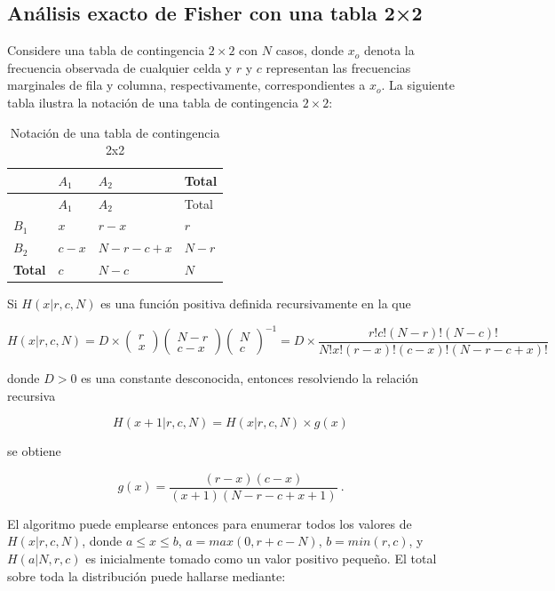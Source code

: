 \documentclass[12pt,a4paper,]{book}
\numberwithin{dummy}{section}
\theoremstyle{ocrenumbox}
\theoremstyle{blacknumex}
\theoremstyle{blacknumbox}
\theoremstyle{ocrenum}
\theoremstyle{ocrenum}
\begin{document}
\hypertarget{anuxe1lisis-exacto-de-fisher-con-una-tabla-22}{%
\subsection{Análisis exacto de Fisher con una tabla
2×2}\label{anuxe1lisis-exacto-de-fisher-con-una-tabla-22}}

Considere una tabla de contingencia \(2\times2\) con \(N\) casos, donde
\(x_o\) denota la frecuencia observada de cualquier celda y \(r\) y
\(c\) representan las frecuencias marginales de fila y columna,
respectivamente, correspondientes a \(x_o\). La siguiente tabla ilustra
la notación de una tabla de contingencia \(2\times2\):

\begin{longtable}[]{@{}llll@{}}
\caption{Notación de una tabla de contingencia 2x2}\tabularnewline
\toprule
& \(A_1\) & \(A_2\) & Total \\
\midrule
\endfirsthead
\toprule
& \(A_1\) & \(A_2\) & Total \\
\midrule
\endhead
\(B_1\) & \(x\) & \(r-x\) & \(r\) \\
\(B_2\) & \(c-x\) & \(N-r-c+x\) & \(N-r\) \\
\textbf{Total} & \(c\) & \(N-c\) & \(N\) \\
\bottomrule
\end{longtable}

Si \(H(x|r, c,N)\) es una función positiva definida recursivamente en la
que

\[
H(x|r, c,N)=D\times\left(\begin{array}{c}r\\ x\end{array}\right)\left(\begin{array}{c}N-r\\ c-x\end{array}\right)\left(\begin{array}{c}N\\ c\end{array}\right)^{-1}=D\times\frac{r!c!(N-r)!(N-c)!}{N!x!(r-x)!(c-x)!(N-r-c+x)!}
\]

donde \(D > 0\) es una constante desconocida, entonces resolviendo la
relación recursiva

\[
H(x+1|r, c,N)=H(x|r, c,N)\times g(x)
\]

se obtiene

\[
g(x)=\frac{(r-x)(c-x)}{(x+1)(N-r-c+x+1)}~.
\]

El algoritmo puede emplearse entonces para enumerar todos los valores de
\(H(x|r, c,N)\), donde \(a \le x \le b\), \(a = max(0, r + c - N)\),
\(b = min(r, c)\), y \(H(a|N, r, c)\) es inicialmente tomado como un
valor positivo pequeño. El total sobre toda la distribución puede
hallarse mediante:
\end{document}
